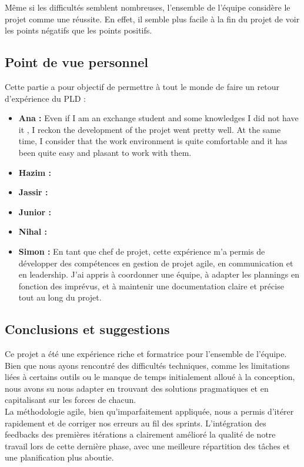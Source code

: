 \documentclass[a4paper]{article}
\begin{document}
Même si les difficultés semblent nombreuses, l'ensemble de l'équipe considère le projet comme une réussite. En effet, il semble plus facile à la fin du projet de voir les points négatifs que les points positifs.

\subsection{Point de vue personnel}
Cette partie a pour objectif de permettre à tout le monde de faire un retour d'expérience du PLD :
\begin{itemize}
    \item \textbf{Ana : }Even if I am an exchange student and some knowledges I did not have it , I reckon the development of the projet went pretty well. At the same time, I consider that the work environment is quite comfortable and it has been quite easy and plasant to work with them.
    \item \textbf{Hazim : }
    \item \textbf{Jassir : }
    \item \textbf{Junior : }
    \item \textbf{Nihal : }
    \item \textbf{Simon :} En tant que chef de projet, cette expérience m'a permis de développer des compétences en gestion de projet agile, en communication et en leadership. J'ai appris à coordonner une équipe, à adapter les plannings en fonction des imprévus, et à maintenir une documentation claire et précise tout au long du projet.
\end{itemize}


\subsection{Conclusions et suggestions}
Ce projet a été une expérience riche et formatrice pour l’ensemble de l’équipe. Bien que nous ayons rencontré des difficultés techniques, comme les limitations liées à certains outils ou le manque de temps initialement alloué à la conception, nous avons su nous adapter en trouvant des solutions pragmatiques et en capitalisant sur les forces de chacun. \\

La méthodologie agile, bien qu’imparfaitement appliquée, nous a permis d’itérer rapidement et de corriger nos erreurs au fil des sprints. L'intégration des feedbacks des premières itérations a clairement amélioré la qualité de notre travail lors de cette dernière phase, avec une meilleure répartition des tâches et une planification plus aboutie. \\
\end{document}

